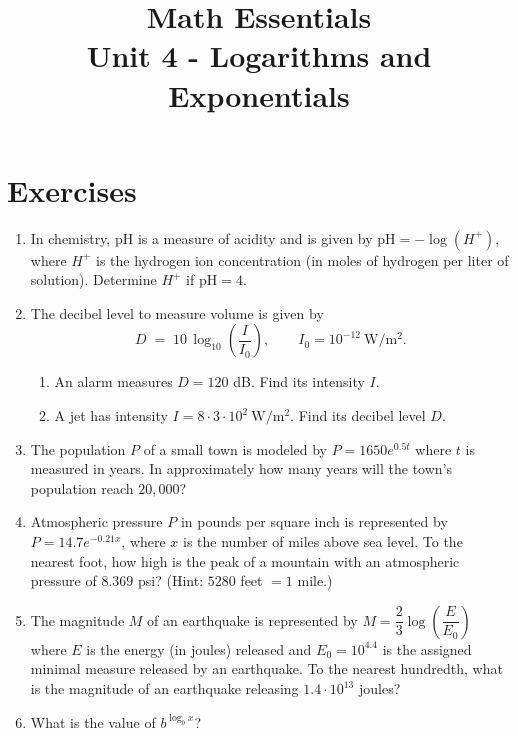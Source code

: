 \documentclass{article}
\title{Math Essentials \\ Unit 4 - Logarithms and Exponentials}
\author{}
\date{}
\begin{document}
\maketitle

\section*{Exercises}

\begin{enumerate}[label=\textbf{\arabic*.}, leftmargin=*, itemsep=0.6em]

\item In chemistry, \(\mathrm{pH}\) is a measure of acidity and is given by \(\mathrm{pH}=-\log(H^+)\), where \(H^+\) is the hydrogen ion concentration (in moles of hydrogen per liter of solution). Determine \(H^+\) if \(\mathrm{pH}=4\).

\item The decibel level to measure volume is given by
\[
D \;=\; 10\,\log_{10}\!\left(\frac{I}{I_0}\right), \qquad I_0 = 10^{-12}\ \mathrm{W/m^2}.
\]
\begin{enumerate}[label=(\alph*)]
  \item An alarm measures \(D=120\) dB. Find its intensity \(I\).
  \item A jet has intensity \(I=8\cdot 3\cdot 10^{2}\ \mathrm{W/m^2}\). Find its decibel level \(D\).
\end{enumerate}

\item The population \(P\) of a small town is modeled by \(P=1650e^{0.5t}\) where \(t\) is measured in years. In approximately how many years will the town’s population reach \(20{,}000\)?

\item Atmospheric pressure \(P\) in pounds per square inch is represented by \(P=14.7e^{-0.21x}\), where \(x\) is the number of miles above sea level. To the nearest foot, how high is the peak of a mountain with an atmospheric pressure of \(8.369\) psi? (Hint: \(5280\) feet \(=1\) mile.)

\item The magnitude \(M\) of an earthquake is represented by \(M=\dfrac{2}{3}\log\!\left(\dfrac{E}{E_0}\right)\) where \(E\) is the energy (in joules) released and \(E_0=10^{4.4}\) is the assigned minimal measure released by an earthquake. To the nearest hundredth, what is the magnitude of an earthquake releasing \(1.4\cdot 10^{13}\) joules?

\item What is the value of  \(b^{\log_b x}\)?


\end{enumerate}
\end{document}
